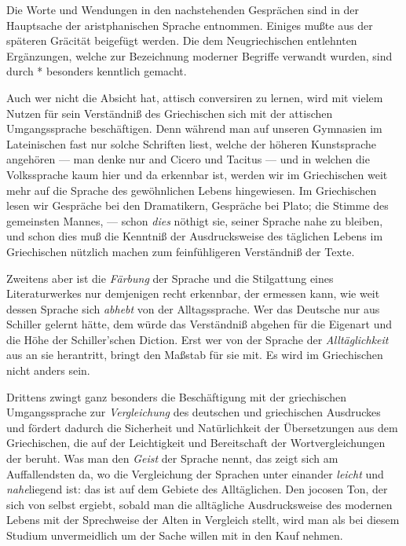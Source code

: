 Die Worte und Wendungen in den nachstehenden Gesprächen sind in der
Hauptsache der aristphanischen Sprache entnommen. Einiges mußte aus
der späteren Gräcität beigefügt werden. Die dem Neugriechischen entlehnten
Ergänzungen, welche zur Bezeichnung moderner Begriffe verwandt wurden,
sind durch {*} besonders kenntlich gemacht.

Auch wer nicht die Absicht hat, attisch conversiren zu lernen, wird
mit vielem Nutzen für sein Verständniß des Griechischen sich mit der
attischen Umgangs\textcompwordmark{}sprache beschäftigen. Denn während
man auf unseren Gymnasien im Lateinischen fast nur solche Schriften
liest, welche der höheren Kunst\textcompwordmark{}sprache angehören
--- man denke nur and Cicero und Tacitus --- und in welchen die Volks\textcompwordmark{}sprache
kaum hier und da er\textcompwordmark{}kennbar ist, werden wir im
Griechischen weit mehr auf die Sprache des gewöhnlichen Lebens hin\textcompwordmark{}gewiesen.
Im Griechischen lesen wir Gespräche bei den Dramatikern, Gespräche
bei Plato; die Stimme des gemeinsten Mannes, --- schon \emph{dies}
nöthigt sie, seiner Sprache nahe zu bleiben, und schon dies muß die
Kenntniß der Aus\textcompwordmark{}drucks\textcompwordmark{}weise
des täglichen Lebens im Griechischen nützlich machen zum feinfühligeren
Verständniß der Texte.

Zweitens aber ist die \emph{Färbung} der Sprache und die Stil\textcompwordmark{}gattung
eines Literatur\textcompwordmark{}werkes nur demjenigen recht erkennbar,
der ermessen kann, wie weit dessen Sprache sich \emph{abhebt} von
der Alltags\textcompwordmark{}sprache. Wer das Deutsche nur aus Schiller
gelernt hätte, dem würde das Verständniß ab\textcompwordmark{}gehen
für die Eigenart und die Höhe der Schiller'schen Diction. Erst wer
von der Sprache der \emph{Alltäglichkeit} aus an sie herantritt,
bringt den Maßstab für sie mit. Es wird im Griechischen nicht anders
sein.

Drittens zwingt ganz besonders die Beschäftigung mit der griechischen
Um\textcompwordmark{}gangs\textcompwordmark{}sprache zur \emph{Vergleichung}
des deutschen und griechischen Aus\textcompwordmark{}druckes und
fördert dadurch die Sicherheit und Natürlichkeit der Über\textcompwordmark{}setzungen
aus dem Griechischen, die auf der Leichtigkeit und Bereit\textcompwordmark{}schaft
der Wort\textcompwordmark{}ver\textcompwordmark{}gleichungen der
beruht. Was man den \emph{Geist} der Sprache nennt, das zeigt sich
am Auf\textcompwordmark{}fallendsten da, wo die Vergleichung der
Sprachen unter einander \emph{leicht} und \emph{nahe}liegend ist:
das ist auf dem Gebiete des Alltäglichen. Den jocosen Ton, der sich
von selbst ergiebt, sobald man die alltägliche Aus\textcompwordmark{}drucks\textcompwordmark{}weise
des modernen Lebens mit der Sprechweise der Alten in Vergleich stellt,
wird man als bei diesem Studium unvermeidlich um der Sache willen
mit in den Kauf nehmen.

